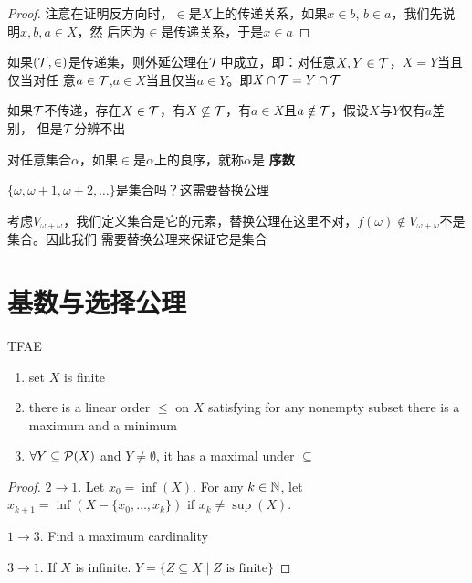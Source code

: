\documentclass[11pt]{article}
\begin{document}
\begin{proof}
注意在证明反方向时，\(\in\)是\(X\)上的传递关系，如果\(x\in b\), \(b\in a\)，我们先说明\(x,b,a\in X\)，然
后因为\(\in\)是传递关系，于是\(x\in a\)
\end{proof}

\begin{exercise}
如果\((\mathcal{T},\in)\)是传递集，则外延公理在\(\mathcal{T}\)中成立，即：对任意\(X,Y\in\mathcal{T}\)，\(X=Y\)当且仅当对任
意\(a\in\mathcal{T}\),\(a\in X\)当且仅当\(a\in Y\)。即\(X\cap\mathcal{T}=Y\cap\mathcal{T}\)
\end{exercise}

如果\(\mathcal{T}\)不传递，存在\(X\in\mathcal{T}\)，有\(X\not\subseteq\mathcal{T}\)，有\(a\in X\)且\(a\notin\mathcal{T}\)，假设\(X\)与\(Y\)仅有\(a\)差别，
但是\(\mathcal{T}\)分辨不出

\begin{definition}[]
对任意集合\(\alpha\)，如果\(\in\)是\(\alpha\)上的良序，就称\(\alpha\)是 \textbf{序数}
\end{definition}

\(\{\omega,\omega+1,\omega+2,\dots\}\)是集合吗？这需要替换公理

考虑\(V_{\omega+\omega}\)，我们定义集合是它的元素，替换公理在这里不对，\(f(\omega)\notin V_{\omega+\omega}\)不是集合。因此我们
需要替换公理来保证它是集合
\section{基数与选择公理}
\label{sec:org9bfe7de}
\begin{proposition}[]
TFAE
\begin{enumerate}
\item set \(X\) is finite
\item there is a linear order \(\le\) on \(X\) satisfying for any nonempty subset there is a maximum
and a minimum
\item \(\forall Y\subseteq\mathcal{P}(X)\) and \(Y\neq\emptyset\), it has a maximal under \(\subseteq\)
\end{enumerate}
\end{proposition}

\begin{proof}
\(2\to 1\). Let \(x_0=\inf(X)\). For any \(k\in\mathbb{N}\), let \(x_{k+1}=\inf(X-\{x_0,\dots,x_k\})\)
if \(x_k\neq\sup(X)\).

\(1\to 3\). Find a maximum cardinality

\(3\to 1\). If \(X\) is infinite. \(Y=\{Z\subseteq X\mid Z\text{ is finite}\}\)
\end{proof}
\end{document}
